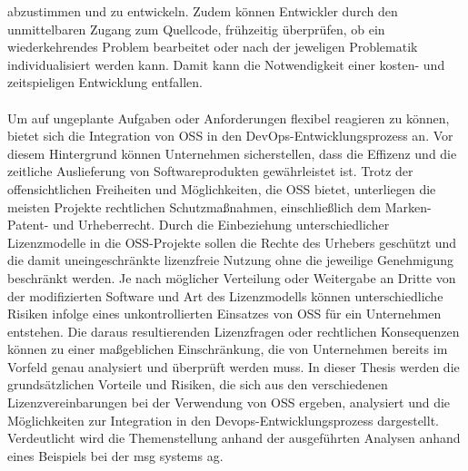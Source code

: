 abzustimmen und zu entwickeln. Zudem können Entwickler durch den unmittelbaren Zugang zum Quellcode, frühzeitig überprüfen, ob ein wiederkehrendes Problem bearbeitet oder nach der jeweligen Problematik individualisiert werden kann. Damit kann die Notwendigkeit einer kosten- und zeitspieligen Entwicklung entfallen.\\\\ Um auf ungeplante Aufgaben oder Anforderungen flexibel reagieren zu können, bietet sich die Integration von OSS in den DevOps-Entwicklungsprozess an. Vor diesem Hintergrund können Unternehmen sicherstellen, dass die Effizenz und die zeitliche Auslieferung von Softwareprodukten gewährleistet ist. Trotz der offensichtlichen Freiheiten und Möglichkeiten, die OSS bietet, unterliegen die meisten Projekte rechtlichen Schutzmaßnahmen, einschließlich dem Marken- Patent- und Urheberrecht. Durch die Einbeziehung unterschiedlicher Lizenzmodelle in die OSS-Projekte sollen die Rechte des Urhebers geschützt und die damit uneingeschränkte lizenzfreie Nutzung ohne die jeweilige Genehmigung beschränkt werden. Je nach möglicher Verteilung oder Weitergabe an Dritte von der modifizierten Software und Art des Lizenzmodells können unterschiedliche Risiken infolge eines unkontrollierten Einsatzes von OSS für ein Unternehmen entstehen. Die daraus resultierenden Lizenzfragen oder rechtlichen Konsequenzen können zu einer maßgeblichen Einschränkung, die von Unternehmen bereits im Vorfeld genau analysiert und überprüft werden muss. In dieser Thesis werden die grundsätzlichen Vorteile und Risiken, die sich aus den verschiedenen Lizenzvereinbarungen bei der Verwendung von OSS ergeben, analysiert und die Möglichkeiten zur Integration in den Devops-Entwicklungsprozess dargestellt. Verdeutlicht wird die Themenstellung anhand der ausgeführten Analysen anhand eines Beispiels bei der msg systems ag.


